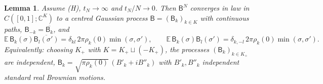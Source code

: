 \documentclass[11pt]{article}
\newcommand{\E}{\mathbb{E}}
\newcommand{\C}{\mathbb{C}}
\newcommand{\sB}{\mathsf{B}}
\newtheorem{lemma}[theorem]{Lemma}
\theoremstyle{remark}
\begin{document}
\begin{lemma}\label{lem:fclt}
Assume \textup{(H)}, $t_N\to\infty$ and $t_N/N\to0$. Then $\sB^N$ converges
in law in $C([0,1];\C^K)$ to a centred Gaussian process
$\sB=(\sB_k)_{k\in K}$ with continuous paths, $\sB_{-k}=\overline{\sB_k}$,
and
\begin{equation}
  \E\,\sB_k(\sigma)\overline{\sB_l(\sigma')}
  =\delta_{kl}\,2\pi\rho_k(0)\min(\sigma,\sigma'),\qquad
  \E\,\sB_k(\sigma)\sB_l(\sigma')
  =\delta_{k,-l}\,2\pi\rho_k(0)\min(\sigma,\sigma').
  \label{eq:cov}
\end{equation}
Equivalently: choosing $K_+$ with $K=K_+\sqcup(-K_+)$, the processes
$(\sB_k)_{k\in K_+}$ are independent,
$\sB_k=\sqrt{\pi\rho_k(0)}\,(B'_k+iB''_k)$ with $B'_k,B''_k$ independent
standard real Brownian motions.
\end{lemma}
\end{document}
